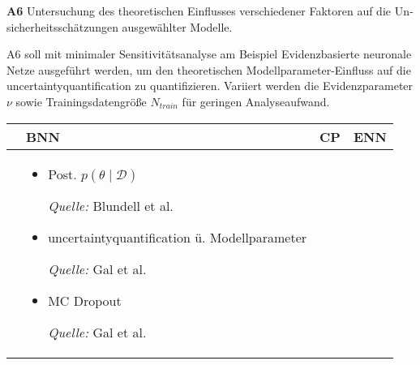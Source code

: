 \begin{otherlanguage}{ngerman}

\textbf{A6} Untersuchung des theoretischen Einflusses verschiedener Faktoren auf die Unsicherheitsschätzungen ausgewählter Modelle.
\par\vspace{1\baselineskip}\noindent

A6 soll mit minimaler Sensitivitätsanalyse am Beispiel \gls{Evidenzbasierte neuronale Netze} ausgeführt werden, um den theoretischen Modellparameter-Einfluss auf die \gls{uncertaintyquantification} zu quantifizieren. Variiert werden die Evidenzparameter $\nu$ sowie Trainingsdatengröße $N_{train}$ für geringen Analyseaufwand.



\begin{table}[!htpb]
  \centering
  \footnotesize
  \begin{tabularx}{\textwidth}{|>{\centering\arraybackslash}l|X|X|X|}
    \hline
    & \hspace{0.6em}\textbf{BNN} 
    & \hspace{0.6em}\textbf{CP} 
    & \hspace{0.6em}\textbf{ENN} \\
    \hline

    \multirow{7}{*}{\textbf{A}} & 
    \begin{minipage}[t]{\linewidth}
    \vspace{0.3em}
    \begin{itemize}[leftmargin=*, label={}, itemsep=0.125em, topsep=0em, parsep=0em]
        \item Post. \( p(\theta \mid \mathcal{D}) \) \par
        \begin{scriptsize}\textit{Quelle:} Blundell et al. \parencite*[Kap.~3]{blundell2015weight}\end{scriptsize}
        \item \gls{uncertaintyquantification} ü. Modellparameter \par
        \begin{scriptsize}\textit{Quelle:} Gal et al. \parencite*[S.~40–42]{gal2016uncertainty}\end{scriptsize}
        \item MC Dropout \par
        \begin{scriptsize}\textit{Quelle:} Gal et al. \parencite*[S.~40–42]{gal2016uncertainty}\end{scriptsize}
    \end{itemize}
    \vspace{0.3em}
    \end{minipage} &


\end{tabularx}
\end{table}
\end{otherlanguage}
